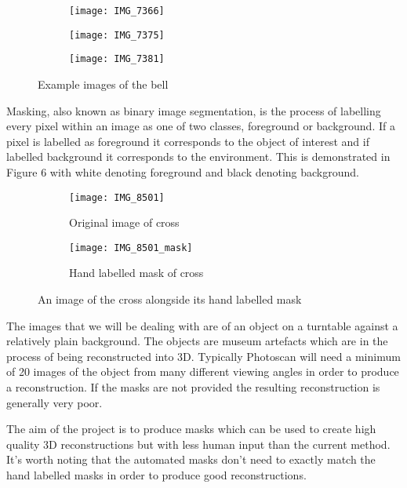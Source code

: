 \documentclass[12pt]{IIBproject}
\begin{document}
\begin{figure}[H]
\centering
\begin{subfigure}{.33\textwidth}
  \centering
  \texttt{[image: IMG\_7366]}
  \label{fig:sub1}
\end{subfigure}%
\begin{subfigure}{.33\textwidth}
  \centering
  \texttt{[image: IMG\_7375]}
  \label{fig:sub2}
\end{subfigure}
\begin{subfigure}{.33\textwidth}
  \centering
  \texttt{[image: IMG\_7381]}
  \label{fig:sub2}
\end{subfigure}
\caption{Example images of the bell}
\label{fig:test}
\end{figure}
Masking, also known as binary image segmentation, is the process of labelling every pixel within an image as one of two classes, foreground or background. If a pixel is labelled as foreground it corresponds to the object of interest and if labelled background it corresponds to the environment. This is demonstrated in Figure 6 with white denoting foreground and black denoting background. 
\begin{figure}[H]
\centering
\begin{subfigure}{.5\textwidth}
  \centering
  \texttt{[image: IMG\_8501]}
  \caption{Original image of cross}
  \label{fig:sub1}
\end{subfigure}%
\begin{subfigure}{.5\textwidth}
  \centering
  \texttt{[image: IMG\_8501\_mask]}
  \caption{Hand labelled mask of cross}
  \label{fig:sub2}
\end{subfigure}
\caption{An image of the cross alongside its hand labelled mask}
\label{fig:test}
\end{figure}
The images that we will be dealing with are of an object on a turntable against a relatively plain background. The objects are museum artefacts which are in the process of being reconstructed into 3D. Typically Photoscan will need a minimum of 20 images of the object from many different viewing angles in order to produce a reconstruction. If the masks are not provided the resulting reconstruction is generally very poor\cite{photoscanManual}. 

The aim of the project is to produce masks which can be used to create high quality 3D reconstructions but with less human input than the current method. It's worth noting that the automated masks don't need to exactly match the hand labelled masks in order to produce good reconstructions.
\end{document}
